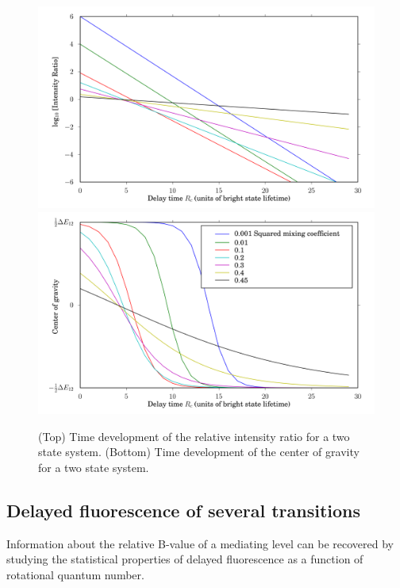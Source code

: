 \documentclass[12pt]{mitthesis}
\begin{document}
\begin{figure}
  \caption{(Top) Time development of the relative intensity ratio for
    a two state system. (Bottom) Time development of the center of
    gravity for a two state system.}
  \label{fig:cog-devel}
  \centering
  \includegraphics[width=6in]{ratio-development.png}
  \includegraphics[width=6in]{cog-development.png}
\end{figure}




\subsection*{Delayed fluorescence of several transitions}

Information about the relative B-value of a mediating level can be
recovered by studying the statistical properties of delayed
fluorescence as a function of rotational quantum number.
\end{document}
